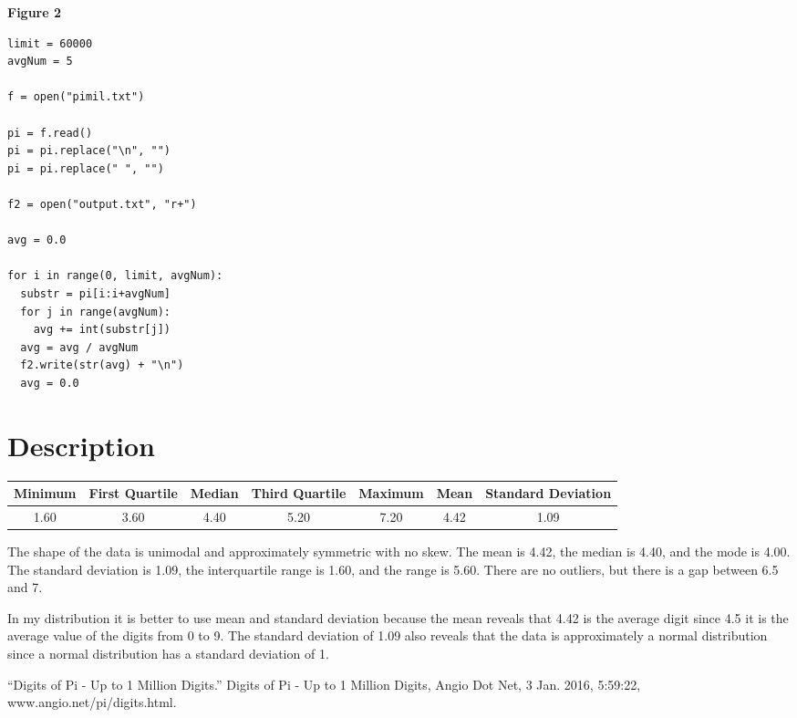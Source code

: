 \documentclass{article}
\begin{document}
\vspace{20px}

\centerline{\textbf{Figure 2}}

\begin{lstlisting}
limit = 60000
avgNum = 5

f = open("pimil.txt")

pi = f.read()
pi = pi.replace("\n", "")
pi = pi.replace(" ", "")

f2 = open("output.txt", "r+")

avg = 0.0

for i in range(0, limit, avgNum):
  substr = pi[i:i+avgNum]
  for j in range(avgNum):
    avg += int(substr[j])
  avg = avg / avgNum
  f2.write(str(avg) + "\n")
  avg = 0.0
\end{lstlisting}

\section{Description}
\begin{center}
  \begin{tabular}{||c | c | c | c | c | c | c||} 
  \hline\hline
  Minimum & First Quartile & Median & Third Quartile & Maximum & Mean & Standard Deviation\\ [0.5ex] 
  \hline
  1.60 & 3.60 & 4.40 & 5.20 & 7.20 & 4.42 & 1.09\\ 
  \hline\hline
  \end{tabular}
\end{center}
{The shape of the data is unimodal and approximately symmetric with no skew. The mean is 4.42, the median is 4.40, and the mode is 4.00. The standard deviation is 1.09, the interquartile range is 1.60, and the range is 5.60. There are no outliers, but there is a gap between 6.5 and 7.}

{In my distribution it is better to use mean and standard deviation because the mean reveals that 4.42 is the average digit since 4.5 it is the average value of the digits from 0 to 9. The standard deviation of 1.09 also reveals that the data is approximately a normal distribution since a normal distribution has a standard deviation of 1.}

  

\begin{thebibliography}{1}

{“Digits of Pi - Up to 1 Million Digits.” Digits of Pi - Up to 1 Million Digits, Angio Dot Net, 3 Jan. 2016, 5:59:22, www.angio.net/pi/digits.html.}

\end{thebibliography}
\end{document}
